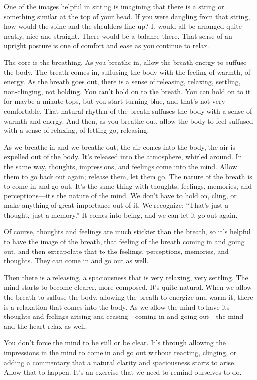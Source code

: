 One of the images helpful in sitting is imagining that there is a string
or something similar at the top of your head. If you were dangling from
that string, how would the spine and the shoulders line up? It would all
be arranged quite neatly, nice and straight. There would be a balance
there. That sense of an upright posture is one of comfort and ease as
you continue to relax.

The core is the breathing. As you breathe in, allow the breath energy to
suffuse the body. The breath comes in, suffusing the body with the
feeling of warmth, of energy. As the breath goes out, there is a sense
of releasing, relaxing, settling, non-clinging, not holding. You can’t
hold on to the breath. You can hold on to it for maybe a minute tops,
but you start turning blue, and that’s not very comfortable. That
natural rhythm of the breath suffuses the body with a sense of warmth
and energy. And then, as you breathe out, allow the body to feel
suffused with a sense of relaxing, of letting go, releasing.

As we breathe in and we breathe out, the air comes into the body, the
air is expelled out of the body. It’s released into the atmosphere,
whirled around. In the same way, thoughts, impressions, and feelings
come into the mind. Allow them to go back out again; release them, let
them go. The nature of the breath is to come in and go out. It’s the
same thing with thoughts, feelings, memories, and perceptions—it’s the
nature of the mind. We don’t have to hold on, cling, or make anything of
great importance out of it. We recognize: “That’s just a thought, just a
memory.” It comes into being, and we can let it go out again.

Of course, thoughts and feelings are much stickier than the breath, so
it’s helpful to have the image of the breath, that feeling of the breath
coming in and going out, and then extrapolate that to the feelings,
perceptions, memories, and thoughts. They can come in and go out as
well.

Then there is a releasing, a spaciousness that is very relaxing, very
settling. The mind starts to become clearer, more composed. It’s quite
natural. When we allow the breath to suffuse the body, allowing the
breath to energize and warm it, there is a relaxation that comes into
the body. As we allow the mind to have its thoughts and feelings arising
and ceasing—coming in and going out—the mind and the heart relax as
well.

You don’t force the mind to be still or be clear. It’s through allowing
the impressions in the mind to come in and go out without reacting,
clinging, or adding a commentary that a natural clarity and spaciousness
starts to arise. Allow that to happen. It’s an exercise that we need to
remind ourselves to do.

